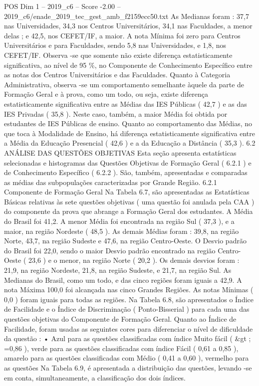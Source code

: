 \begin{textsample}{POS Dim 1 – 2019\_c6 – Score -2.00 – 2019\_c6/enade\_2019\_tec\_gest\_amb\_f2159ecc50.txt}
As Medianas foram : 37,7 nas Universidades, 34,3 nos Centros Universitários, 34,1 nas Faculdades, a menor delas ; e 42,5, nos CEFET/IF, a maior.
A nota Mínima foi zero para Centros Universitários e para Faculdades, sendo 5,8 nas Universidades, e 1,8, nos CEFET/IF.
Observa -se que somente não existe diferença estatisticamente significativa, ao nível de 95 \%, no Componente de Conhecimento Específico entre as notas dos Centros Universitários e das Faculdades.
Quanto à Categoria Administrativa, observa -se um comportamento semelhante àquele da parte de Formação Geral e à prova, como um todo, ou seja, existe diferença estatisticamente significativa entre as Médias das IES Públicas ( 42,7 ) e as das IES Privadas ( 35,8 ).
Neste caso, também, a maior Média foi obtida por estudantes de IES Públicas de ensino.
Quanto ao comportamento das Médias, no que toca à Modalidade de Ensino, há diferença estatisticamente significativa entre a Média da Educação Presencial ( 42,6 ) e a da Educação a Distância ( 35,3 ). 6.2 ANÁLISE DAS QUESTÕES OBJETIVAS Esta seção apresenta estatísticas selecionadas e histogramas das Questões Objetivas de Formação Geral ( 6.2.1 ) e de Conhecimento Específico ( 6.2.2 ).
São, também, apresentadas e comparadas as médias das subpopulações caracterizadas por Grande Região. 6.2.1 Componente de Formação Geral Na Tabela 6.7, são apresentadas as Estatísticas Básicas relativas às sete questões objetivas ( uma questão foi anulada pela CAA ) do componente da prova que abrange a Formação Geral dos estudantes.
A Média do Brasil foi 41,2.
A menor Média foi encontrada na região Sul ( 37,3 ), e a maior, na região Nordeste ( 48,5 ).
As demais Médias foram : 39,8, na região Norte, 43,7, na região Sudeste e 47,6, na região Centro-Oeste.
O Desvio padrão do Brasil foi 22,0, sendo o maior Desvio padrão encontrado na região Centro-Oeste ( 23,6 ) e o menor, na região Norte ( 20,2 ).
Os demais desvios foram : 21,9, na região Nordeste, 21,8, na região Sudeste, e 21,7, na região Sul.
As Medianas do Brasil, como um todo, e das cinco regiões foram iguais a 42,9.
A nota Máxima 100,0 foi alcançada nas cinco Grandes Regiões.
As notas Mínimas ( 0,0 ) foram iguais para todas as regiões.
Na Tabela 6.8, são apresentados o Índice de Facilidade e o Índice de Discriminação ( Ponto-Bisserial ) para cada uma das questões objetivas do Componente de Formação Geral.
Quanto ao Índice de Facilidade, foram usadas as seguintes cores para diferenciar o nível de dificuldade da questão : • Azul para as questões classificadas com índice Muito fácil ( \&gt ; =0,86 ), verde para as questões classificadas com índice Fácil ( 0,61 a 0,85 ), amarelo para as questões classificadas com Médio ( 0,41 a 0,60 ), vermelho para as questões Na Tabela 6.9, é apresentada a distribuição das questões, levando -se em conta, simultaneamente, a classificação dos dois índices.

\end{textsample}

